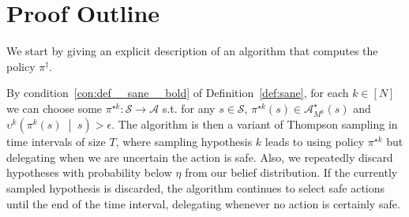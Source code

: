 \documentclass[anon,12pt]{colt2018} %
\newcommand{\APM}[2]{\left(#1\;\middle\vert\;#2\right)}
\newcommand{\A}{\mathcal{A}}
\newcommand{\St}{\mathcal{S}}
\newcommand{\Ad}{\upsilon}
\begin{document}
\section{Proof Outline}

We start by giving an explicit description of an algorithm that computes the policy $\pi^\dagger$.

By condition~\ref{con:def__sane__bold} of Definition~\ref{def:sane}, for each $k\in[N]$ we can choose some $\pi^{\star k}: \St \rightarrow \A$ s.t. for any $s \in \St$, $\pi^{\star k}(s) \in \A_{M^k}^\star(s)$ and $\Ad^k\APM{\pi^k(s)}{s} > \epsilon$. The algorithm is then a variant of Thompson sampling in time intervals of size $T$, where sampling hypothesis $k$ leads to using policy $\pi^{\star k}$ but delegating when we are uncertain the action is safe. Also, we repeatedly discard hypotheses with probability below $\eta$ from our belief distribution. If the currently sampled hypothesis is discarded, the algorithm continues to select safe actions until the end of the time interval, delegating whenever no action is certainly safe.\pagebreak

\LinesNumbered
\DontPrintSemicolon
{}
\end{document}
